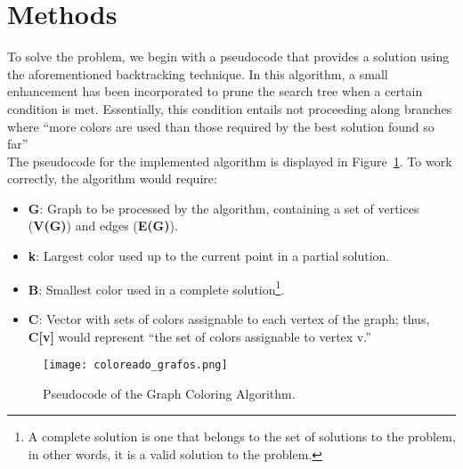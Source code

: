 \documentclass[british,a4paper,11pt,titlepage]{article}
\begin{document}
\section{Methods}
\label{sec:methods}

To solve the problem, we begin with a pseudocode that provides a solution using the aforementioned backtracking technique. In this algorithm, a small enhancement has been incorporated to prune the search tree when a certain condition is met. Essentially, this condition entails not proceeding along branches where ``more colors are used than those required by the best solution found so far''
\\
The pseudocode for the implemented algorithm is displayed in Figure~\ref{fig:pseudo_coloreado}. To work correctly, the algorithm would require:
\begin{itemize}
    \item \textbf{G}: Graph to be processed by the algorithm, containing a set of vertices (\textbf{V(G)}) and edges (\textbf{E(G)}).
    \item \textbf{k}: Largest color used up to the current point in a partial solution.
    \item \textbf{B}: Smallest color used in a complete solution\footnote{A complete solution is one that belongs to the set of solutions to the problem, in other words, it is a valid solution to the problem.}.
    \item \textbf{C}: Vector with sets of colors assignable to each vertex of the graph; thus, \textbf{C[v]} would represent ``the set of colors assignable to vertex v.''
\end{itemize}

\begin{figure}[p]
  \centering
  \texttt{[image: coloreado\_grafos.png]}%
  \hspace{0.1\linewidth}%
  \caption[Pseudocode of the Graph Coloring Algorithm]{Pseudocode of the Graph Coloring Algorithm.}
  \label{fig:pseudo_coloreado}
\end{figure}
\end{document}
